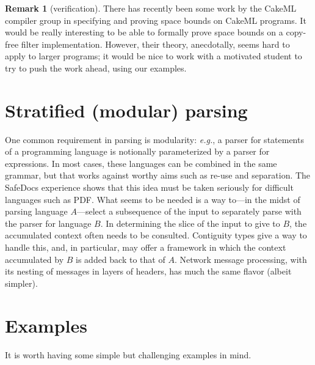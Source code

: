 \documentclass{article}
\newcommand{\eg}{\textit{e.g.}}
\theoremstyle{definition}
\newtheorem{remark}{Remark}
\begin{document}
\begin{remark} [verification]
There has recently been some work by the CakeML compiler group in
specifying and proving space bounds on CakeML programs. It would be
really interesting to be able to formally prove space bounds on a
copy-free filter implementation. However, their theory, anecdotally,
seems hard to apply to larger programs; it would be nice to work with
a motivated student to try to push the work ahead, using our examples.
\end{remark}


\section{Stratified (modular) parsing}

 One common requirement in parsing is modularity: \eg, a parser for
 statements of a programming language is notionally parameterized by a
 parser for expressions. In most cases, these languages can be
 combined in the same grammar, but that works against worthy aims such
 as re-use and separation. The SafeDocs experience shows that this
 idea must be taken seriously for difficult languages such as
 PDF. What seems to be needed is a way to---in the midst of parsing
 language $A$---select a subsequence of the input to separately parse
 with the parser for language $B$. In determining the slice of the
 input to give to $B$, the accumulated context often needs to be
 consulted. Contiguity types give a way to handle this, and, in
 particular, may offer a framework in which the context accumulated by
 $B$ is added back to that of $A$. Network message processing, with
 its nesting of messages in layers of headers, has much the same
 flavor (albeit simpler).

\section{Examples}

It is worth having some simple but challenging examples in mind.
\end{document}
